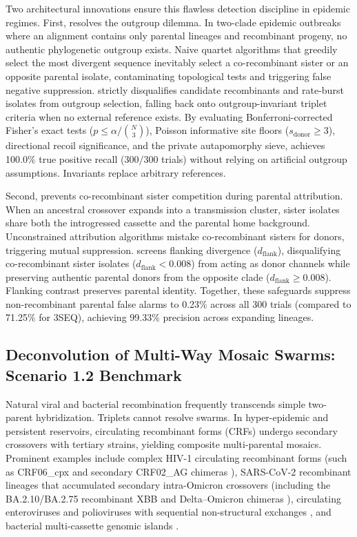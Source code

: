 Two architectural innovations ensure this flawless detection discipline in epidemic regimes.
First, \RhizAeon resolves the outgroup dilemma.
In two-clade epidemic outbreaks where an alignment contains only parental lineages and recombinant progeny, no authentic phylogenetic outgroup exists.
Naive quartet algorithms that greedily select the most divergent sequence inevitably select a co-recombinant sister or an opposite parental isolate, contaminating topological tests and triggering false negative suppression.
\RhizAeon strictly disqualifies candidate recombinants and rate-burst isolates from outgroup selection, falling back onto outgroup-invariant triplet criteria when no external reference exists.
By evaluating Bonferroni-corrected Fisher's exact tests ($p \le \alpha / \binom{N}{3}$), Poisson informative site floors ($s_{\text{donor}} \ge 3$), directional recoil significance, and the private autapomorphy sieve, \RhizAeon achieves 100.0\% true positive recall ($300/300$ trials) without relying on artificial outgroup assumptions.
Invariants replace arbitrary references.

Second, \RhizAeon prevents co-recombinant sister competition during parental attribution.
When an ancestral crossover expands into a transmission cluster, sister isolates share both the introgressed cassette and the parental home background.
Unconstrained attribution algorithms mistake co-recombinant sisters for donors, triggering mutual suppression.
\RhizAeon screens flanking divergence ($d_{\text{flank}}$), disqualifying co-recombinant sister isolates ($d_{\text{flank}} < 0.008$) from acting as donor channels while preserving authentic parental donors from the opposite clade ($d_{\text{flank}} \ge 0.008$).
Flanking contrast preserves parental identity.
Together, these safeguards suppress non-recombinant parental false alarms to 0.23\% across all 300 trials (compared to 71.25\% for 3SEQ), achieving 99.33\% precision across expanding lineages.

\subsection{Deconvolution of Multi-Way Mosaic Swarms: Scenario 1.2 Benchmark}
\label{subsec:multiway_mosaicism}

Natural viral and bacterial recombination frequently transcends simple two-parent hybridization.
Triplets cannot resolve swarms.
In hyper-epidemic and persistent reservoirs, circulating recombinant forms (CRFs) undergo secondary crossovers with tertiary strains, yielding composite multi-parental mosaics.
Prominent examples include complex HIV-1 circulating recombinant forms (such as CRF06\_cpx and secondary CRF02\_AG chimeras \cite{carr1998full}), SARS-CoV-2 recombinant lineages that accumulated secondary intra-Omicron crossovers (including the BA.2.10/BA.2.75 recombinant XBB and Delta--Omicron chimeras \cite{turakhia2022pandemic,tamura2023xbb,smith2023tracking}), circulating enteroviruses and polioviruses with sequential non-structural exchanges \cite{simmonds2005}, and bacterial multi-cassette genomic islands \cite{didelot2010impact}.

